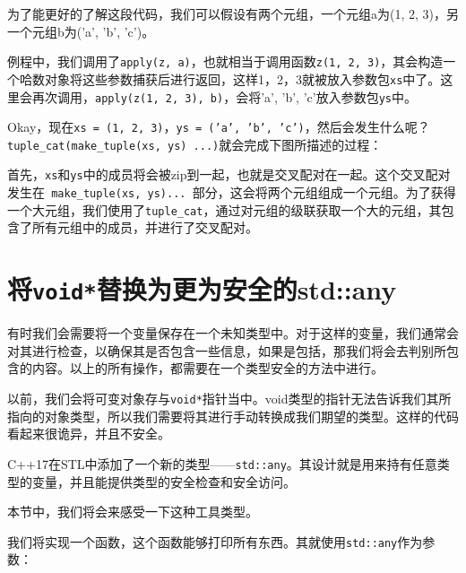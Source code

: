 为了能更好的了解这段代码，我们可以假设有两个元组，一个元组a为(1, 2, 3)，另一个元组b为('a', 'b', 'c')。

例程中，我们调用了\texttt{apply(z, a)}，也就相当于调用函数\texttt{z(1, 2, 3)}，其会构造一个哈数对象将这些参数捕获后进行返回，这样1，2，3就被放入参数包\texttt{xs}中了。这里会再次调用，\texttt{apply(z(1, 2, 3), b)}，会将'a', 'b', 'c'放入参数包\texttt{ys}中。

Okay，现在\texttt{xs = (1, 2, 3)}，\texttt{ys = ('a', 'b', 'c')}，然后会发生什么呢？\texttt{tuple\_cat(make\_tuple(xs, ys) ...)}就会完成下图所描述的过程：


首先，\texttt{xs}和\texttt{ys}中的成员将会被zip到一起，也就是交叉配对在一起。这个交叉配对发生在\texttt{ make\_tuple(xs, ys)... }部分，这会将两个元组组成一个元组。为了获得一个大元组，我们使用了\texttt{tuple\_cat}，通过对元组的级联获取一个大的元组，其包含了所有元组中的成员，并进行了交叉配对。


\section{将\texttt{void*}替换为更为安全的std::any}

有时我们会需要将一个变量保存在一个未知类型中。对于这样的变量，我们通常会对其进行检查，以确保其是否包含一些信息，如果是包括，那我们将会去判别所包含的内容。以上的所有操作，都需要在一个类型安全的方法中进行。

以前，我们会将可变对象存与\texttt{void*}指针当中。void类型的指针无法告诉我们其所指向的对象类型，所以我们需要将其进行手动转换成我们期望的类型。这样的代码看起来很诡异，并且不安全。

C++17在STL中添加了一个新的类型——\texttt{std::any}。其设计就是用来持有任意类型的变量，并且能提供类型的安全检查和安全访问。

本节中，我们将会来感受一下这种工具类型。


我们将实现一个函数，这个函数能够打印所有东西。其就使用\texttt{std::any}作为参数：

